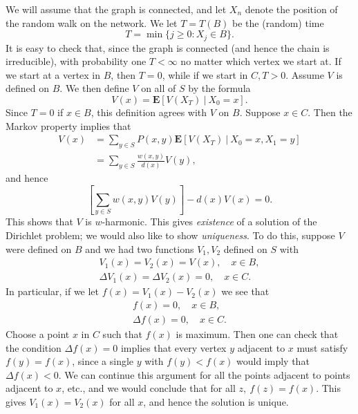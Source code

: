 \documentclass{stml-l}
\theoremstyle{definition}
\numberwithin{equation}{chapter}
\numberwithin{figure}{chapter}
\numberwithin{figure}{section}
\begin{document}
We will assume that the graph is connected, and let $X_{n}$ denote
the position of the random walk on the network. We let $T=T(B)$ be
the (random) time
\begin{equation*}
T=\min\{j\geq 0:X_{j}\in B\}.
\end{equation*}
It is easy to check that, since the graph is connected (and hence
the chain is irreducible), with probability one $ T<\infty$ no
matter which vertex we start at. If we start at a vertex in $B$,
then $T=0$, while if we start in $C,T>0$. Assume $V$ is defined on
$B$. We then define $V$ on all of $S$ by the formula
\begin{equation*}
V(x)=\mathbf{E}[V(X_{T})\ |\ X_{0}=x].
\end{equation*}
Since $T=0$ if $x\in B$, this definition agrees with $V$ on $B$.
Suppose $x\in C$. Then the Markov property implies that
\begin{align*}
V(x)&=\sum\limits_{y\in S}P(x,y)\mathbf{E}[V(X_{T})\ |\ X_{0}=x,X_{1}=y]\\
&= \sum\limits_{y\in S}\frac{w(x,y)}{d(x)}V(y),
\end{align*}
and hence
\begin{equation*}
\left[\sum\limits_{y\in S}w(x,y)V(y)\right]-d(x)V(x)=0.
\end{equation*}
This shows that $V$ is $w$-harmonic. This gives \emph{existence} of
a solution of the Dirichlet problem; we would also like to show
\emph{uniqueness}. To do this, suppose $V$ were defined on $B$ and
we had two functions $V_{1},V_{2}$ defined on $S$ with
\begin{gather*}
V_{1}(x)=V_{2}(x)=V(x),\quad x\in B,\\
\Delta V_{1}(x)=\Delta V_{2}(x)=0,\quad x\in C.
\end{gather*}
In particular, if we let $f(x)=V_{1}(x)-V_{2}(x)$ we see that
\begin{gather*}
f(x)=0,\quad x\in B,\\
\Delta f(x)=0,\quad x\in C.
\end{gather*}
Choose a point $x$ in $C$ such that $f(x)$ is maximum. Then one can
check that the condition $\Delta f(x)=0$ implies that every vertex
$y$ adjacent to $x$ must satisfy $f(y)=f(x)$, since a single $y$
with $f(y)<f(x)$ would imply that $\Delta f(x)<0$. We can continue
this argument for all the points adjacent to points adjacent to $x$,
etc., and we would conclude that for all $z,\ f(z)=f(x)$. This gives
$V_{1}(x)=V_{2}(x)$ for all $x$, and hence the solution is unique.
\end{document}
